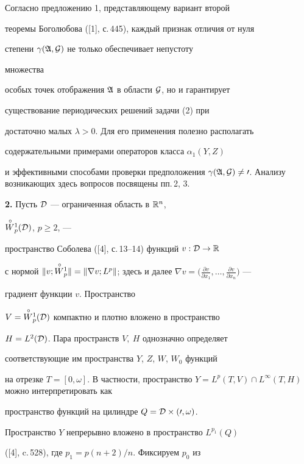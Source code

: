  


Согласно предложению 1, представляющему вариант второй 


теоремы Боголюбова ([1], с.\,445), каждый признак отличия от нуля 


степени $\gamma(\frak A,\cal G)$ не только обеспечивает непустоту 


множества 


особых точек отображения $\frak A$ в области $\cal G$, но и гарантирует 


существование периодических решений задачи (2) при 


достаточно малых $\lambda>0$. Для его применения полезно располагать 


содержательными примерами операторов класса $\alpha_1(Y,Z)$ 


и эффективными способами проверки предположения $\gamma(\frak A,\cal 


G)\ne0$. Анализу возникающих здесь вопросов посвящены пп.\,2, 3. 


\medskip 


 


{\bf 2.} Пусть $\cal D$ --- ограниченная область в $\Bbb R^n$, 


$\overset{\,\circ}{W}{}^1_p(\cal D)$, $p\ge2$, --- 


пространство Соболева ([4], с.\,13--14) функций $v:\cal D\to\Bbb R$ 


с нормой $\|v;\up{W}^1_p\|=\|\nabla v;L^p\|$; здесь и далее $\nabla 


v=\big(\frac{\partial v}{\partial x_1},\dotsc, 


\frac{\partial v}{\partial x_n}\big)$ --- 


градиент функции $v$. Пространство 


$V=\overset{\,\circ}{W}{}^1_p(\cal D)$ компактно и плотно вложено в пространство 


$H=L^2(\cal D)$. Пара пространств $V,\ H$ однозначно определяет 


соответствующие им пространства $Y$, $Z$, $W$, $W_0$ функций 


на отрезке $T=[0,\omega]$. В частности, пространство $Y=L^p(T,V)\cap 


L^\infty(T,H)$ можно интерпретировать как 


пространство функций на цилиндре $Q=\cal D\times(0,\omega)$. 


Пространство $Y$ непрерывно вложено в пространство $L^{p_1}(Q)$ 


([4], c.\,528), где $p_1=p(n+2)/n$. Фиксируем $p_0$ из 


